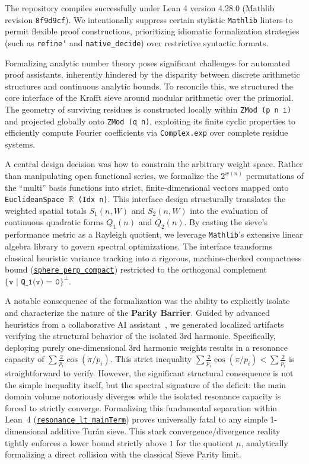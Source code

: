 \documentclass[lean]{AFM}
\renewcommand{\.}{\hskip .75pt}
\def\urlpfx{https://github.com/ElNando888/KrafftSieve/blob/v1.0}
\begin{document}
The repository compiles successfully under Lean 4 version 4.28.0 (Mathlib revision \texttt{8f9d9cf}).
We intentionally suppress certain stylistic \texttt{Mathlib} linters to permit flexible proof
constructions, prioritizing idiomatic formalization strategies (such as \texttt{refine'} and
\texttt{native\_decide}) over restrictive syntactic formats.

Formalizing analytic number theory poses significant challenges for automated proof assistants,
inherently hindered by the disparity between discrete arithmetic structures and continuous analytic
bounds. To reconcile this, we structured the core interface of the Krafft sieve around modular
arithmetic over the primorial. The geometry of surviving residues is constructed locally within
\texttt{ZMod (p n i)} and projected globally onto \texttt{ZMod (q n)}, exploiting its finite cyclic
properties to efficiently compute Fourier coefficients via \texttt{Complex.exp} over complete
residue systems. 

A central design decision was how to constrain the arbitrary weight space. Rather than manipulating
open functional series, we formalize the $2^{w(n)}$ permutations of the ``multi'' basis functions
into strict, finite-dimensional vectors mapped onto \texttt{EuclideanSpace $\mathbb{R}$ (Idx n)}.
This interface design structurally translates the weighted spatial totals $S_1(n, W)$ and $S_2(n, W)$
into the evaluation of continuous quadratic forms $Q_1(n)$ and $Q_2(n)$. By casting the sieve's
performance metric as a Rayleigh quotient, we leverage \texttt{Mathlib}'s extensive linear algebra
library to govern spectral optimizations. The interface transforms classical heuristic variance
tracking into a rigorous, machine-checked compactness bound
(\href{\urlpfx/KrafftSieve/OptimalWeights.lean#L459}{\texttt{sphere\_perp\_compact}})
restricted to the orthogonal complement $\texttt{\{v | Q\_1(v) = 0\}}^{\perp}$.

A notable consequence of the formalization was the ability to explicitly isolate and characterize
the nature of the \textbf{Parity Barrier}. Guided by advanced heuristics from a collaborative AI
assistant~\cite{Achim2025}, we generated localized artifacts verifying the structural behavior
of the isolated 3rd harmonic. Specifically, deploying purely one-dimensional 3rd harmonic weights
results in a resonance capacity of $\sum \frac{2}{p_i} \cos(\pi/p_i)$. This strict inequality
$\sum \frac{2}{p_i}\cos(\pi/p_i) < \sum \frac{2}{p_i}$ is straightforward to verify. However,
the significant structural consequence is not the simple inequality itself, but the spectral
signature of the deficit: the main domain volume notoriously diverges while the isolated resonance
capacity is forced to strictly converge. Formalizing this fundamental separation within Lean~4
(\href{\urlpfx/KrafftSieve/ThirdHarmonic.lean#L823}{\texttt{resonance\_lt\_mainTerm}}) proves
universally fatal to any simple 1-dimensional additive Turán sieve. This stark
convergence/divergence reality tightly enforces a lower bound strictly above $1$ for the quotient
$\mu$, analytically formalizing a direct collision with the classical Sieve Parity limit.
\end{document}
